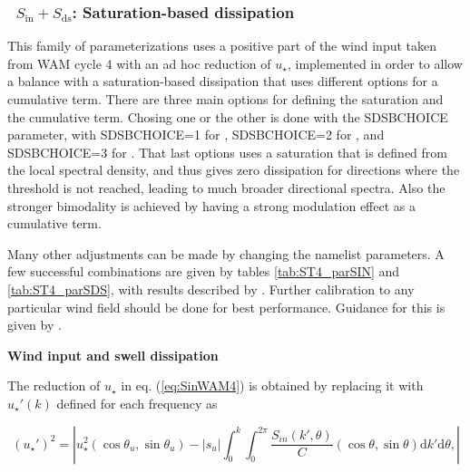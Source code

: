 \vsssub
\subsubsection{~$S_{\mathrm{in}} + S_{\mathrm{ds}}$: Saturation-based dissipation} \label{sec:ST4}
\vsssub


\noindent 
This family of parameterizations uses a positive part of the wind input taken
from WAM cycle 4 with an ad hoc reduction of $u_\star$, implemented in
order to allow a balance with a saturation-based dissipation that uses different options for 
a cumulative term. There are three main options for defining the saturation and the cumulative term. Chosing one or the other is done with the  {\F SDSBCHOICE} parameter, with  {\F SDSBCHOICE=1} for \cite{art:Aea10},  {\F SDSBCHOICE=2} for \cite{Filipot&Ardhuin2012}, and {\F SDSBCHOICE=3} for \cite{Romero2019}. That last options uses a saturation that is defined from the local spectral density, and thus gives zero dissipation for directions where the threshold is not reached, leading to much broader directional spectra. Also the stronger bimodality is achieved by having a strong modulation effect as a cumulative term. 

Many other adjustments can be made by changing the namelist parameters. A few successful combinations 
are given by tables \ref{tab:ST4_parSIN} and \ref{tab:ST4_parSDS}, with results described by \citep{art:RA13,art:SAG16}. 
Further calibration to any particular wind field should be done for best performance. Guidance for this is given by \cite{Stopa2018}. 

\vsssub
\textbf{Wind input and swell dissipation} 
\vsssub


The reduction of $u_\star$ in
eq. (\ref{eq:SinWAM4}) is obtained by replacing it with $u_\star '(k)$ defined for each
frequency as

\begin{equation}
\left(u_\star '\right)^2=\left|u_\star^2 \left(\cos \theta_u, \sin
\theta_u \right) - \left|s_u\right| \int_0^k \int_0^{2 \pi}
\frac{S_{in}\left(k',\theta \right)}{C}  \left(\cos \theta, \sin
\theta \right)  {\mathrm d} k' \mathrm d
\theta,\label{ustarp}\right|
\end{equation}

